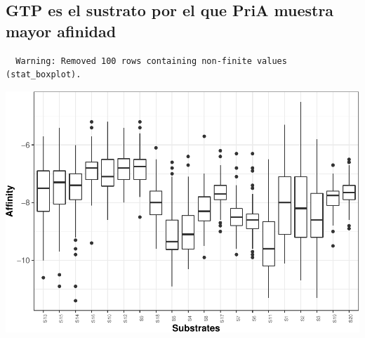 \documentclass[12pt,twoside]{reedthesis}
\begin{document}
  \subsection{GTP es el sustrato por el que PriA muestra mayor
  afinidad}\label{gtp-es-el-sustrato-por-el-que-pria-muestra-mayor-afinidad}
  
  \begin{Shaded}
  \begin{Highlighting}[]
  \NormalTok{(}\OperatorTok{+}\StringTok{ }\NormalTok{(} \NormalTok{, } \NormalTok{,} \NormalTok{(}\NormalTok{)) }\OperatorTok{+}\StringTok{ }\NormalTok{()}\OperatorTok{+}\NormalTok{()}\OperatorTok{+}\NormalTok{(} \NormalTok{(} \NormalTok{, } \NormalTok{), } \NormalTok{(} \NormalTok{), } \NormalTok{(}\NormalTok{), }\NormalTok{(} \NormalTok{,} \NormalTok{), } \NormalTok{)}
  \end{Highlighting}
  \end{Shaded}
  
  \begin{verbatim}
  Warning: Removed 100 rows containing non-finite values (stat_boxplot).
  \end{verbatim}
  
  \begin{center}\includegraphics{tesis_files/figure-latex/substrateBox-1} \end{center}
  
\end{document}
